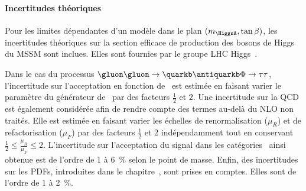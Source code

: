 \paragraph{Incertitudes théoriques}
Pour les limites dépendantes d'un modèle dans le plan $(m_{\HiggsA},\tan\beta)$,
les incertitudes théoriques sur la section efficace de production des bosons de Higgs du MSSM sont inclues.
Elles sont fournies par le groupe LHC Higgs~\cite{MSSMneutralHiggsTwiki}.
\par
Dans le cas du processus $\gluon\gluon\to\quarkb\antiquarkb\Phi\to\tau\tau$, l'incertitude sur l'acceptation en fonction de \Nbjets\ est estimée en faisant varier le paramètre  du générateur de \POWHEG\ par des facteurs $\frac{1}{2}$ et $2$.
Une incertitude sur la QCD est également considérée afin de rendre compte des termes au-delà du NLO non traités.
Elle est estimée en faisant varier les échelles de renormalisation ($\mu_R$) et de refactorisation ($\mu_F$) par des facteurs $\frac{1}{2}$ et $2$ indépendamment tout en conservant $\frac{1}{2}\leq\frac{\mu_R}{\mu_F}\leq2$.
L'incertitude sur l'acceptation du signal dans les catégories \CATbtag\ ainsi obtenue est de l'ordre de \num{1} à \SI{6}{\%} selon le point de masse.
Enfin, des incertitudes sur les PDFs, introduites dans le chapitre~, sont prises en comptes.
Elles sont de l'ordre de \num{1} à \SI{2}{\%}.